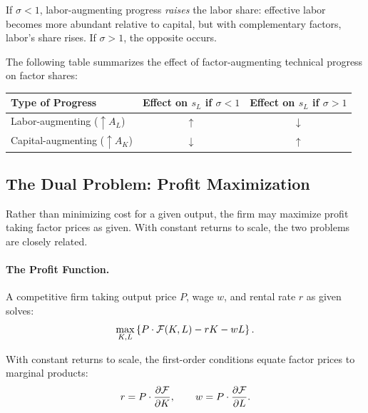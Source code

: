 If $\sigma < 1$, labor-augmenting progress \emph{raises} the labor share: effective labor becomes more abundant relative to capital, but with complementary factors, labor's share rises. If $\sigma > 1$, the opposite occurs.

The following table summarizes the effect of factor-augmenting technical progress on factor shares:

\begin{center}
\renewcommand{\arraystretch}{1.3}
\begin{tabular}{@{}lcc@{}}
\toprule
Type of Progress & Effect on $s_L$ if $\sigma < 1$ & Effect on $s_L$ if $\sigma > 1$ \\
\midrule
Labor-augmenting ($\uparrow A_L$) & $\uparrow$ & $\downarrow$ \\
Capital-augmenting ($\uparrow A_K$) & $\downarrow$ & $\uparrow$ \\
\bottomrule
\end{tabular}
\end{center}

\subsection{The Dual Problem: Profit Maximization}
\label{subsec:dual-problem}

Rather than minimizing cost for a given output, the firm may maximize profit taking factor prices as given. With constant returns to scale, the two problems are closely related.

\paragraph{The Profit Function.}
A competitive firm taking output price $P$, wage $w$, and rental rate $r$ as given solves:
\begin{equation}
\max_{K, L} \left\{ P \cdot \mathcal{F}(K, L) - rK - wL \right\}.
\label{eq:profit-max}
\end{equation}

With constant returns to scale, the first-order conditions equate factor prices to marginal products:
\begin{equation}
r = P \cdot \frac{\partial \mathcal{F}}{\partial K}, \qquad w = P \cdot \frac{\partial \mathcal{F}}{\partial L}.
\label{eq:foc-profit}
\end{equation}

